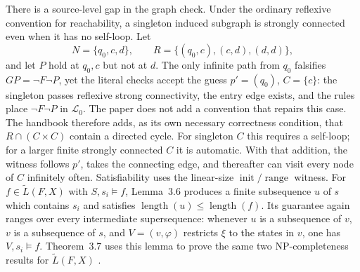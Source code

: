 There is a source-level gap in the graph check.  Under the ordinary reflexive
convention for reachability, a singleton induced subgraph is strongly
connected even when it has no self-loop.  Let
\[
 N=\{q_0,c,d\},\qquad
 R=\{(q_0,c),(c,d),(d,d)\},
\]
and let \(P\) hold at \(q_0,c\) but not at \(d\).  The only infinite path
from \(q_0\) falsifies \(GP=\neg F\neg P\), yet the literal checks accept the
guess \(p'=(q_0)\), \(C=\{c\}\): the singleton passes reflexive strong
connectivity, the entry edge exists, and the rules place
\(\neg F\neg P\) in \(\mathcal L_0\).  The paper does not add a convention
that repairs this case.  The handbook therefore adds, as its own necessary
correctness condition, that \(R\cap(C\times C)\) contain a directed cycle.
For singleton \(C\) this requires a self-loop; for a larger finite strongly
connected \(C\) it is automatic.  With that addition, the witness follows
\(p'\), takes the connecting edge, and thereafter can visit every node of
\(C\) infinitely often.
Satisfiability uses the linear-size
\(\operatorname{init}/\operatorname{range}\) witness.  For
\(f\in\widetilde L(F,X)\) with \(S,s_i\models f\), Lemma~3.6 produces a finite
subsequence \(u\) of \(s\) which contains \(s_i\) and satisfies
\(\operatorname{length}(u)\le\operatorname{length}(f)\).  Its guarantee again
ranges over every intermediate supersequence: whenever \(u\) is a subsequence
of \(v\), \(v\) is a subsequence of \(s\), and \(V=(v,\varphi)\) restricts
\(\xi\) to the states in \(v\), one has \(V,s_i\models f\).  Theorem~3.7 uses
this lemma to prove the same two NP-completeness results for
\(\widetilde L(F,X)\)
\cite[pp.~735--739]{SistlaClarke1985}.

